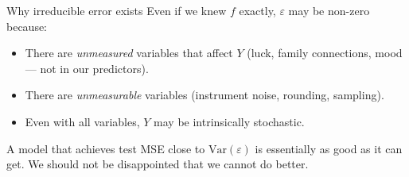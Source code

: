 \documentclass[aspectratio=169,11pt]{beamer}
\begin{document}
\begin{frame}{Why irreducible error exists}
  Even if we knew $f$ exactly, $\varepsilon$ may be non-zero because:
  \begin{readme}
    \begin{itemize}
      \item There are \emph{unmeasured} variables that affect $Y$
            (luck, family connections, mood --- not in our predictors).
      \item There are \emph{unmeasurable} variables (instrument
            noise, rounding, sampling).
      \item Even with all variables, $Y$ may be intrinsically
            stochastic.
    \end{itemize}
  \end{readme}
  \begin{takeaway}
    A model that achieves test MSE close to
    $\mathrm{Var}(\varepsilon)$ is essentially as good as it can get.
    We should not be disappointed that we cannot do better.
  \end{takeaway}
\end{frame}
\end{document}
